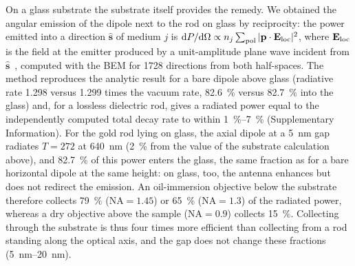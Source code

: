 \documentclass[11pt,a4paper]{article}
\begin{document}
On a glass substrate the substrate itself provides the remedy. We obtained the angular emission of the dipole next to
the rod on glass by reciprocity: the power emitted into a direction $\hat{\mathbf s}$ of medium $j$ is
$\mathrm{d}P/\mathrm{d}\Omega\propto n_j\sum_{\rm pol}|\mathbf p\cdot\mathbf E_{\rm loc}|^2$, where
$\mathbf E_{\rm loc}$ is the field at the emitter produced by a unit-amplitude plane wave incident from
$\hat{\mathbf s}$~\cite{novotny}, computed with the BEM for 1728 directions from both half-spaces. The method
reproduces the analytic result for a bare dipole above glass (radiative rate 1.298 versus 1.299 times the vacuum
rate, \SI{82.6}{\percent} versus \SI{82.7}{\percent} into the glass) and, for a lossless dielectric rod, gives a
radiated power equal to the independently computed total decay rate to within \SIrange{1}{7}{\percent} (Supplementary
Information). For the gold rod lying on glass, the axial dipole at a \SI{5}{nm} gap radiates $T=272$ at
\SI{640}{nm} (\SI{2}{\percent} from the value of the substrate calculation above), and \SI{82.7}{\percent} of this
power enters the glass, the same fraction as for a bare horizontal dipole at the same height: on glass, too, the
antenna enhances but does not redirect the emission. An oil-immersion objective below the substrate therefore
collects \SI{79}{\percent} ($\mathrm{NA}=1.45$) or \SI{65}{\percent} ($\mathrm{NA}=1.3$) of the radiated power,
whereas a dry objective above the sample ($\mathrm{NA}=0.9$) collects \SI{15}{\percent}. Collecting through the
substrate is thus four times more efficient than collecting from a rod standing along the optical axis, and the
gap does not change these fractions (\SIrange{5}{20}{nm}).
\end{document}
